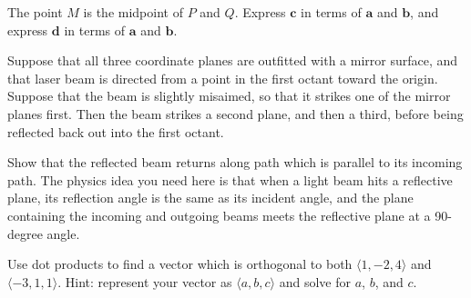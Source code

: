 \documentclass{watsonbook}
\begin{document}
\begin{aexercise}
  \begin{minipage}[t]{0.58\textwidth}
    The point $M$ is the midpoint of $P$ and $Q$. Express $\mathbf{c}$
    in terms of $\mathbf{a}$ and $\mathbf{b}$, and express $\mathbf{d}$
    in terms of $\mathbf{a}$ and $\mathbf{b}$.
  \end{minipage} \hspace{6mm}
  \begin{minipage}[t]{0.4\textwidth}
  \end{minipage}
\end{aexercise}

\begin{aexercise}
  Suppose that all three coordinate planes are outfitted with a mirror
  surface, and that laser beam is directed from a point in the first
  octant toward the origin. Suppose that the beam is slightly
  misaimed, so that it strikes one of the mirror planes first. Then
  the beam strikes a second plane, and then a third, before being
  reflected back out into the first octant.

  Show that the reflected beam returns along  path which is parallel
  to its incoming path. The physics idea you need here is that when  a
  light beam hits a reflective plane, its reflection angle is the same
  as its incident angle, and the plane containing the incoming and
  outgoing beams meets the reflective plane at a 90-degree angle. 
\end{aexercise}


\begin{aexercise}
  Use dot products to find a vector which is orthogonal to both
  $\langle 1, -2, 4 \rangle$ and $\langle -3, 1, 1 \rangle$. Hint:
  represent your vector as $\langle a, b, c \rangle$ and solve for
  $a$, $b$, and $c$. 
\end{aexercise}
\end{document}
